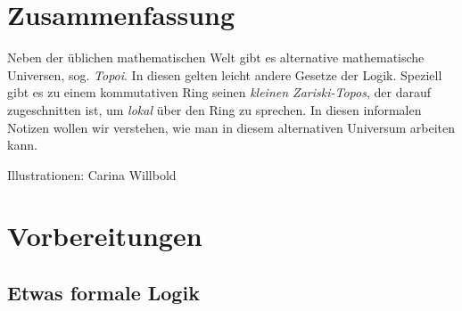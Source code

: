 \documentclass[a4paper,ngerman,12pt]{scrartcl}
\theoremstyle{definition}
\theoremstyle{plain}
\theoremstyle{remark}
\renewcommand{\_}{\mathpunct{.}\,}
\newcommand{\?}{\,{:}\,}
\begin{document}
\newpage

\section*{Zusammenfassung}
Neben der üblichen mathematischen Welt gibt es alternative mathematische
Universen, sog. \emph{Topoi}. In diesen gelten leicht andere Gesetze der Logik.
Speziell gibt es zu einem kommutativen Ring seinen \emph{kleinen
Zariski-Topos}, der darauf zugeschnitten ist, um \emph{lokal} über den Ring zu
sprechen. In diesen informalen Notizen wollen wir verstehen, wie man in diesem
alternativen Universum arbeiten kann.

Illustrationen: Carina Willbold

\newpage

\tableofcontents

\section{Vorbereitungen}

\subsection{Etwas formale Logik}
\end{document}
